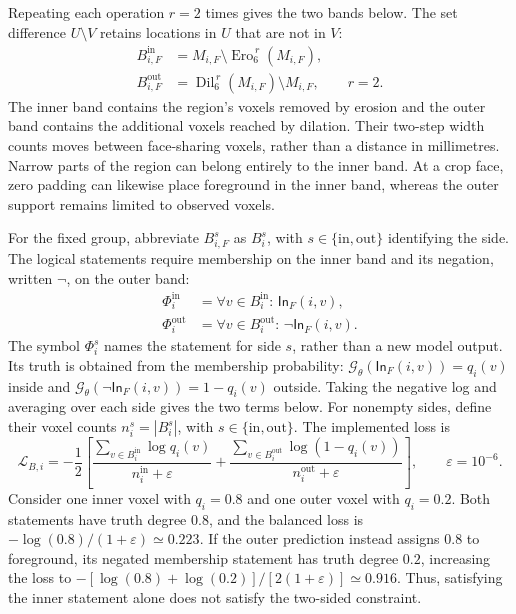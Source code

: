 \documentclass[12pt,a4paper]{article}
\begin{document}
Repeating each operation $r=2$ times gives the two bands below.
The set difference $U\setminus V$ retains locations in $U$ that are
not in $V$:
\begin{equation}
\begin{aligned}
B_{i,F}^{\mathrm{in}}
 &=M_{i,F}\setminus\operatorname{Ero}_6^{\,r}(M_{i,F}),\\
B_{i,F}^{\mathrm{out}}
 &=\operatorname{Dil}_6^{\,r}(M_{i,F})\setminus M_{i,F},
\qquad r=2.
\end{aligned}
\label{eq:reference-boundary-bands}
\end{equation}
The inner band contains the region's voxels removed by erosion and the
outer band contains the additional voxels reached by dilation. Their
two-step width counts moves between face-sharing voxels, rather than a
distance in millimetres. Narrow parts of the region can belong
entirely to the inner band. At a crop face, zero padding can likewise
place foreground in the inner band, whereas the outer support remains
limited to observed voxels.

For the fixed group, abbreviate $B_{i,F}^s$ as $B_i^s$, with
$s\in\{\mathrm{in},\mathrm{out}\}$ identifying the side. The logical
statements require membership on the inner band and its negation,
written $\lnot$, on the outer band:
\begin{equation}
\begin{aligned}
\Phi_i^{\mathrm{in}}
 &=\forall v\in B_i^{\mathrm{in}}:\,\mathsf{In}_{F}(i,v),\\
\Phi_i^{\mathrm{out}}
 &=\forall v\in B_i^{\mathrm{out}}:\,\lnot\mathsf{In}_{F}(i,v).
\end{aligned}
\label{eq:band-logical-statements}
\end{equation}
The symbol $\Phi_i^s$ names the statement for side $s$, rather than a
new model output. Its truth is obtained from the membership probability:
$\mathcal G_\theta(\mathsf{In}_F(i,v))=q_i(v)$ inside and
$\mathcal G_\theta(\lnot\mathsf{In}_F(i,v))=1-q_i(v)$ outside.
Taking the negative log and averaging over each side gives the two terms
below. For nonempty sides, define their voxel counts
$n_i^s=|B_i^s|$, with $s\in\{\mathrm{in},\mathrm{out}\}$. The implemented loss is
\begin{equation}
\mathcal L_{B,i}=-\frac12\left[
\frac{\sum_{v\in B_i^{\mathrm{in}}}\log q_i(v)}{n_i^{\mathrm{in}}+\varepsilon}
+\frac{\sum_{v\in B_i^{\mathrm{out}}}\log(1-q_i(v))}{n_i^{\mathrm{out}}+\varepsilon}
\right],\qquad \varepsilon=10^{-6}.
\label{eq:balanced-band-loss}
\end{equation}
Consider one inner voxel with $q_i=0.8$ and one outer voxel with
$q_i=0.2$. Both statements have truth degree $0.8$, and the balanced
loss is $-\log(0.8)/(1+\varepsilon)\simeq0.223$. If the outer
prediction instead assigns $0.8$ to foreground, its negated membership
statement has truth degree $0.2$, increasing the loss to
$-[\log(0.8)+\log(0.2)]/[2(1+\varepsilon)]\simeq0.916$.
Thus, satisfying the inner statement alone does not satisfy the
two-sided constraint.
\end{document}
